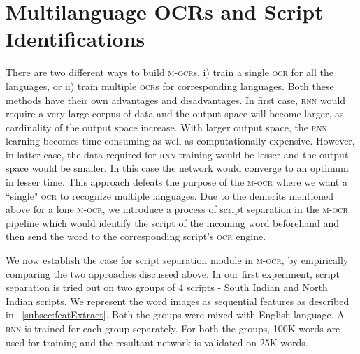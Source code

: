 \section{Multilanguage \textsc{OCR}s and Script Identifications}

There are two different ways to build \textsc{m-ocr}s. i) train a single \textsc{ocr} for all the languages, or ii) train multiple \textsc{ocr}s for corresponding languages. Both these methods have their own advantages and disadvantages. In first case, \textsc{rnn} would require a very large corpus of data and the output space will become larger, as cardinality of the output space increase. With larger output space, the \textsc{rnn} learning becomes time consuming as well as computationally expensive. However, in latter case, the data required for \textsc{rnn} training would be lesser and the output space would be smaller. In this case the network would converge to an optimum in lesser time. This approach defeats the purpose of the \textsc{m-ocr} where we want a ``single" \textsc{ocr} to recognize multiple languages. Due to the demerits mentioned above for a lone \textsc{m-ocr}, we introduce a process of script separation in the \textsc{m-ocr} pipeline which would identify the script of the incoming word beforehand and then send the word to the corresponding script's \textsc{ocr} engine.

We now establish the  case for script separation module in \textsc{m-ocr}, by empirically comparing the two approaches discussed above. In our first experiment, script separation is tried out on two groups of 4 scripts - South Indian and North Indian scripts. We represent the word images as sequential features as described in ~\ref{subsec:featExtract}. Both the groups were mixed with English language. A  \textsc{rnn} is trained for each group separately. For both the groups, 100K words are used for training and the resultant network is validated on 25K words.

